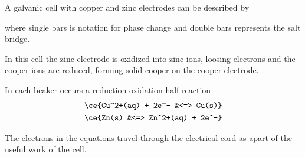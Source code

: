 \documentclass[../mit-general-chemistry.tex]{subfiles}
\begin{document}
A galvanic cell with copper and zinc electrodes can be described by


where single bars is notation for phase change and double bars
represents the salt bridge.

In this cell the zinc electrode is oxidized into zinc ions, loosing
electrons and the cooper ions are reduced, forming solid cooper on the
cooper electrode.

In each beaker occurs a reduction-oxidation half-reaction
\begin{align*}
  \ce{Cu^2+(aq) + 2e^- &<=> Cu(s)} \\
  \ce{Zn(s) &<=> Zn^2+(aq) + 2e^-} \\
\end{align*}

The electrons in the equations travel through the electrical cord as
apart of the useful work of the cell.
\end{document}
